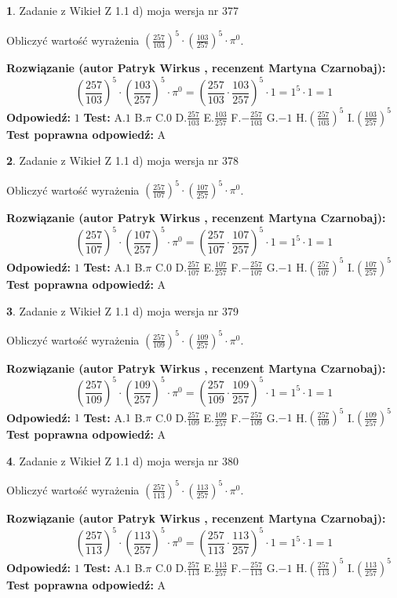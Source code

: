 \documentclass[12pt, a4paper]{article}
\theoremstyle{definition} %
\newtheorem{zad}{}
\newcommand{\zadStart}[1]{\begin{zad}#1\newline}
\newcommand{\zadStop}{\end{zad}}
\newcommand{\rozwStart}[2]{\noindent \textbf{Rozwiązanie (autor #1 , recenzent #2): }\newline}
\newcommand{\rozwStop}{\newline}
\newcommand{\odpStart}{\noindent \textbf{Odpowiedź:}\newline}
\newcommand{\odpStop}{\newline}
\newcommand{\testStart}{\noindent \textbf{Test:}\newline}
\newcommand{\testStop}{\newline}
\newcommand{\kluczStart}{\noindent \textbf{Test poprawna odpowiedź:}\newline}
\newcommand{\kluczStop}{\newline}
\begin{document}
\zadStart{Zadanie z Wikieł Z 1.1 d) moja wersja nr 377}

Obliczyć wartość wyrażenia $(\frac{257}{103})^{5} \cdot (\frac{103}{257})^{5} \cdot \pi^{0}$.
\zadStop
\rozwStart{Patryk Wirkus}{Martyna Czarnobaj}
$$(\frac{257}{103})^{5} \cdot (\frac{103}{257})^{5} \cdot \pi^{0} = (\frac{257}{103} \cdot \frac{103}{257})^{5} \cdot 1 = 1^{5} \cdot 1 = 1$$
\rozwStop
\odpStart
$1$
\odpStop
\testStart
A.$1$ B.$\pi$ C.$0$ D.$\frac{257}{103}$ E.$\frac{103}{257}$
F.$-\frac{257}{103}$ G.$-1$
H.$(\frac{257}{103})^{5}$
I.$(\frac{103}{257})^{5}$
\testStop
\kluczStart
A
\kluczStop



\zadStart{Zadanie z Wikieł Z 1.1 d) moja wersja nr 378}

Obliczyć wartość wyrażenia $(\frac{257}{107})^{5} \cdot (\frac{107}{257})^{5} \cdot \pi^{0}$.
\zadStop
\rozwStart{Patryk Wirkus}{Martyna Czarnobaj}
$$(\frac{257}{107})^{5} \cdot (\frac{107}{257})^{5} \cdot \pi^{0} = (\frac{257}{107} \cdot \frac{107}{257})^{5} \cdot 1 = 1^{5} \cdot 1 = 1$$
\rozwStop
\odpStart
$1$
\odpStop
\testStart
A.$1$ B.$\pi$ C.$0$ D.$\frac{257}{107}$ E.$\frac{107}{257}$
F.$-\frac{257}{107}$ G.$-1$
H.$(\frac{257}{107})^{5}$
I.$(\frac{107}{257})^{5}$
\testStop
\kluczStart
A
\kluczStop



\zadStart{Zadanie z Wikieł Z 1.1 d) moja wersja nr 379}

Obliczyć wartość wyrażenia $(\frac{257}{109})^{5} \cdot (\frac{109}{257})^{5} \cdot \pi^{0}$.
\zadStop
\rozwStart{Patryk Wirkus}{Martyna Czarnobaj}
$$(\frac{257}{109})^{5} \cdot (\frac{109}{257})^{5} \cdot \pi^{0} = (\frac{257}{109} \cdot \frac{109}{257})^{5} \cdot 1 = 1^{5} \cdot 1 = 1$$
\rozwStop
\odpStart
$1$
\odpStop
\testStart
A.$1$ B.$\pi$ C.$0$ D.$\frac{257}{109}$ E.$\frac{109}{257}$
F.$-\frac{257}{109}$ G.$-1$
H.$(\frac{257}{109})^{5}$
I.$(\frac{109}{257})^{5}$
\testStop
\kluczStart
A
\kluczStop



\zadStart{Zadanie z Wikieł Z 1.1 d) moja wersja nr 380}

Obliczyć wartość wyrażenia $(\frac{257}{113})^{5} \cdot (\frac{113}{257})^{5} \cdot \pi^{0}$.
\zadStop
\rozwStart{Patryk Wirkus}{Martyna Czarnobaj}
$$(\frac{257}{113})^{5} \cdot (\frac{113}{257})^{5} \cdot \pi^{0} = (\frac{257}{113} \cdot \frac{113}{257})^{5} \cdot 1 = 1^{5} \cdot 1 = 1$$
\rozwStop
\odpStart
$1$
\odpStop
\testStart
A.$1$ B.$\pi$ C.$0$ D.$\frac{257}{113}$ E.$\frac{113}{257}$
F.$-\frac{257}{113}$ G.$-1$
H.$(\frac{257}{113})^{5}$
I.$(\frac{113}{257})^{5}$
\testStop
\kluczStart
A
\kluczStop
\end{document}
